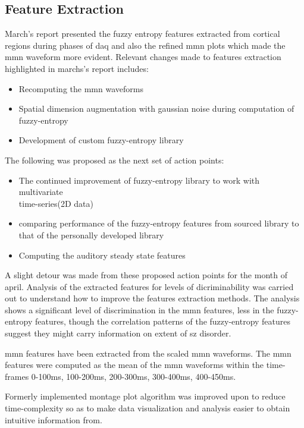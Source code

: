 \documentclass[10pt]{article}
\begin{document}
\subsection{Feature Extraction}
March's report presented the fuzzy entropy features extracted from cortical
regions during phases of \gls{daq} and also the refined \gls{mmn} plots which 
made the \gls{mmn} waveform more evident. Relevant changes made to features 
extraction highlighted in marchs's report includes:
\begin{itemize}
  \item Recomputing the \gls{mmn} waveforms
  \item Spatial dimension augmentation with gaussian noise during computation of fuzzy-entropy
  \item Development of custom fuzzy-entropy library
\end{itemize}
The following was proposed as the next set of action points:
\begin{itemize}
  \item The continued improvement of fuzzy-entropy library to work with multivariate \\
  time-series(2D data)
  \item comparing performance of the fuzzy-entropy features from sourced library to \\
  that of the personally developed library
  \item Computing the auditory steady state features
\end{itemize}
A slight detour was made from these proposed action points for the month of april. 
Analysis of the extracted features for levels of dicriminability was carried out 
to understand how to improve the features extraction methods. The analysis shows 
a significant level of discrimination in the \gls{mmn} features, less in the 
fuzzy-entropy features, though the correlation patterns of the fuzzy-entropy features 
suggest they might carry information on extent of \gls{sz} disorder.

\gls{mmn} features have been extracted from the scaled \gls{mmn} waveforms. The 
\gls{mmn} features were computed as the mean of the \gls{mmn} waveforms within 
the time-frames 0-100ms, 100-200ms, 200-300ms, 300-400ms, 400-450ms.

Formerly implemented montage plot algorithm was improved upon to reduce 
time-complexity so as to make data visualization and analysis easier to obtain 
intuitive information from.
\end{document}
